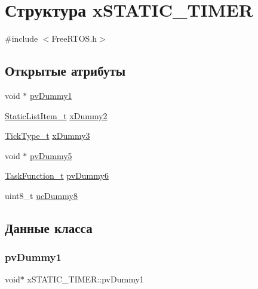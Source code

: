 \hypertarget{structx_s_t_a_t_i_c___t_i_m_e_r}{}\section{Структура x\+S\+T\+A\+T\+I\+C\+\_\+\+T\+I\+M\+ER}
\label{structx_s_t_a_t_i_c___t_i_m_e_r}


{\ttfamily \#include $<$Free\+R\+T\+O\+S.\+h$>$}

\subsection*{Открытые атрибуты}
\begin{DoxyCompactItemize}
\item 
void $\ast$ \mbox{\hyperlink{structx_s_t_a_t_i_c___t_i_m_e_r_a040499298faced6032f84f3a33c785fd}{pv\+Dummy1}}
\item 
\mbox{\hyperlink{_free_r_t_o_s_8h_a1d31bc0472385a87424518da484d9e09}{Static\+List\+Item\+\_\+t}} \mbox{\hyperlink{structx_s_t_a_t_i_c___t_i_m_e_r_a622e2e596e5829c9197bb44b9009474f}{x\+Dummy2}}
\item 
\mbox{\hyperlink{portmacro_8h_aa69c48c6e902ce54f70886e6573c92a9}{Tick\+Type\+\_\+t}} \mbox{\hyperlink{structx_s_t_a_t_i_c___t_i_m_e_r_a60d582d1d0b5b9b15e8050d5ae29bc30}{x\+Dummy3}}
\item 
void $\ast$ \mbox{\hyperlink{structx_s_t_a_t_i_c___t_i_m_e_r_a5150821e9535f86547aafbfc50d44423}{pv\+Dummy5}}
\item 
\mbox{\hyperlink{projdefs_8h_a9b32502ff92c255c686dacde53c1cba0}{Task\+Function\+\_\+t}} \mbox{\hyperlink{structx_s_t_a_t_i_c___t_i_m_e_r_ac0d22064153fd2394380a61528d3c705}{pv\+Dummy6}}
\item 
uint8\+\_\+t \mbox{\hyperlink{structx_s_t_a_t_i_c___t_i_m_e_r_a36a702a7e0e2fec558c8264ff3d88e93}{uc\+Dummy8}}
\end{DoxyCompactItemize}


\subsection{Данные класса}
\mbox{\label{structx_s_t_a_t_i_c___t_i_m_e_r_a040499298faced6032f84f3a33c785fd}} 
\subsubsection{\texorpdfstring{pvDummy1}{pvDummy1}}
{\footnotesize\ttfamily void$\ast$ x\+S\+T\+A\+T\+I\+C\+\_\+\+T\+I\+M\+E\+R\+::pv\+Dummy1}

